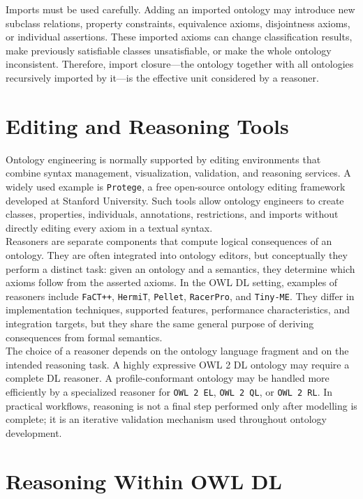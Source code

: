 \documentclass{scrbook}
\begin{document}
	Imports must be used carefully. Adding an imported ontology may introduce new subclass relations, property constraints, equivalence axioms, disjointness axioms, or individual assertions. These imported axioms can change classification results, make previously satisfiable classes unsatisfiable, or make the whole ontology inconsistent. Therefore, import closure---the ontology together with all ontologies recursively imported by it---is the effective unit considered by a reasoner.
	
	\section{Editing and Reasoning Tools}
	
	Ontology engineering is normally supported by editing environments that combine syntax management, visualization, validation, and reasoning services. A widely used example is \texttt{Protege}, a free open-source ontology editing framework developed at Stanford University. Such tools allow ontology engineers to create classes, properties, individuals, annotations, restrictions, and imports without directly editing every axiom in a textual syntax.\\
	
	Reasoners are separate components that compute logical consequences of an ontology. They are often integrated into ontology editors, but conceptually they perform a distinct task: given an ontology and a semantics, they determine which axioms follow from the asserted axioms. In the OWL DL setting, examples of reasoners include \texttt{FaCT++}, \texttt{HermiT}, \texttt{Pellet}, \texttt{RacerPro}, and \texttt{Tiny-ME}. They differ in implementation techniques, supported features, performance characteristics, and integration targets, but they share the same general purpose of deriving consequences from formal semantics.\\
	
	The choice of a reasoner depends on the ontology language fragment and on the intended reasoning task. A highly expressive OWL 2 DL ontology may require a complete DL reasoner. A profile-conformant ontology may be handled more efficiently by a specialized reasoner for \texttt{OWL 2 EL}, \texttt{OWL 2 QL}, or \texttt{OWL 2 RL}. In practical workflows, reasoning is not a final step performed only after modelling is complete; it is an iterative validation mechanism used throughout ontology development.
	
	\section{Reasoning Within OWL DL}
	
\end{document}
